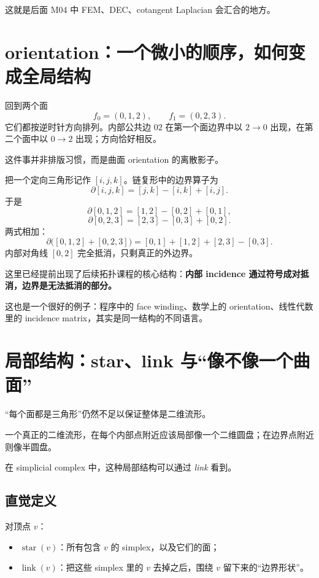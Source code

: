 \documentclass[UTF8,11pt]{ctexart}
\begin{document}
这就是后面 M04 中 FEM、DEC、cotangent Laplacian 会汇合的地方。

\section{orientation：一个微小的顺序，如何变成全局结构}

回到两个面
\[
f_0=(0,1,2),\qquad f_1=(0,2,3).
\]
它们都按逆时针方向排列。内部公共边 $02$ 在第一个面边界中以 $2\to0$ 出现，在第二个面中以 $0\to2$ 出现；方向恰好相反。

这件事并非排版习惯，而是曲面 orientation 的离散影子。

\begin{workedexample}[：边界算子让内部边自动消失]
把一个定向三角形记作 $[i,j,k]$。链复形中的边界算子为
\[
\partial[i,j,k]=[j,k]-[i,k]+[i,j].
\]
于是
\[
\partial[0,1,2]=[1,2]-[0,2]+[0,1],
\]
\[
\partial[0,2,3]=[2,3]-[0,3]+[0,2].
\]
两式相加：
\[
\partial\bigl([0,1,2]+[0,2,3]\bigr)
=[0,1]+[1,2]+[2,3]-[0,3].
\]
内部对角线 $[0,2]$ 完全抵消，只剩真正的外边界。

这里已经提前出现了后续拓扑课程的核心结构：\textbf{内部 incidence 通过符号成对抵消，边界是无法抵消的部分。}
\end{workedexample}

这也是一个很好的例子：程序中的 face winding、数学上的 orientation、线性代数里的 incidence matrix，其实是同一结构的不同语言。

\section{局部结构：star、link 与“像不像一个曲面”}

“每个面都是三角形”仍然不足以保证整体是二维流形。

一个真正的二维流形，在每个内部点附近应该局部像一个二维圆盘；在边界点附近则像半圆盘。

在 simplicial complex 中，这种局部结构可以通过 \emph{link} 看到。

\subsection{直觉定义}

对顶点 $v$：

\begin{itemize}
  \item $\operatorname{star}(v)$：所有包含 $v$ 的 simplex，以及它们的面；
  \item $\operatorname{link}(v)$：把这些 simplex 里的 $v$ 去掉之后，围绕 $v$ 留下来的“边界形状”。
\end{itemize}
\end{document}
